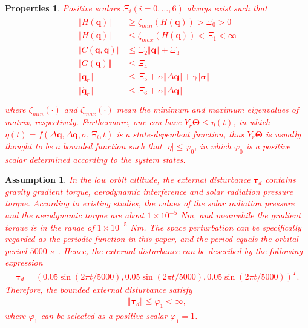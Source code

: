 \documentclass[3p]{elsarticle}
\theoremstyle{plain}
\newtheorem{myas}{Assumption}
\newtheorem{mypro}{Properties}
\theoremstyle{remark}
\begin{document}
\begin{mypro}\cite{parra2003dynamic}\label{pro:1}
\textcolor{red}{Positive scalars $\Xi_i(i = 0,\ldots,6)$ always exist such that
\begin{align}
\begin{split}
\Vert H(\bm q)\Vert & \ge \zeta_{min}(H(\bm q))>\Xi_0>0\\
\Vert H(\bm q)\Vert & \le \zeta_{max}(H(\bm q))<\Xi_1<\infty\\
\Vert C(\bm q,\dot {\bm q})\Vert & \le \Xi_2\Vert\dot {\bm q}\Vert+\Xi_3\\
\Vert G(\bm q)\Vert & \le \Xi_4\\
\Vert \dot {\bm q}_r\Vert & \le \Xi_5+\alpha\Vert\Delta \bm q\Vert+\gamma\Vert\bm\sigma\Vert\\
\Vert \ddot {\bm q}_r\Vert & \le \Xi_6+\alpha\Vert\Delta \dot {\bm q}\Vert\\
\end{split}
\end{align}
where $\zeta_{min}(\cdot)$ and $\zeta_{max}(\cdot)$ mean the minimum and maximum eigenvalues of matrix, respectively. Furthermore, one can have $Y_r\bm\Theta\le \eta(t)$, in which $\eta(t)=f(\Delta \bm q,\Delta \dot {\bm q},\sigma,\Xi_i,t)$ is a state-dependent function, thus $Y_r\bm\Theta$ is usually thought to be a bounded function such that $\vert\eta\vert\le\varphi_0$, in which $\varphi_0$ is a positive scalar determined according to the system states.}
\end{mypro}

\begin{myas}
\textcolor{red}{
In the low orbit altitude, the external disturbance $\bm\tau_d$ contains gravity gradient torque, aerodynamic interference and solar radiation pressure torque. According to existing studies, the values of the solar radiation pressure and the aerodynamic torque are about $1\times10^{-5}$ Nm, and meanwhile the gradient torque is in the range of $1\times10^{-5}$ Nm. The space perturbation can be specifically regarded as the periodic function in this paper, and the period equals the orbital period $5000$ s~\cite{Inamori2015192}. Hence, the external disturbance can be described by the following expression
\begin{align}
\bm\tau_d=\left(0.05\sin(2\pi t/5000),0.05\sin(2\pi t/5000),0.05\sin(2\pi t/5000)\right)^T.
\end{align}
Therefore, the bounded external disturbance satisfy
\begin{align}
\Vert\bm\tau_d\Vert\le\varphi_1<\infty,
\end{align}
where $\varphi_1$ can be selected as a positive scalar $\varphi_1=1$.
}
\end{myas}
\end{document}
